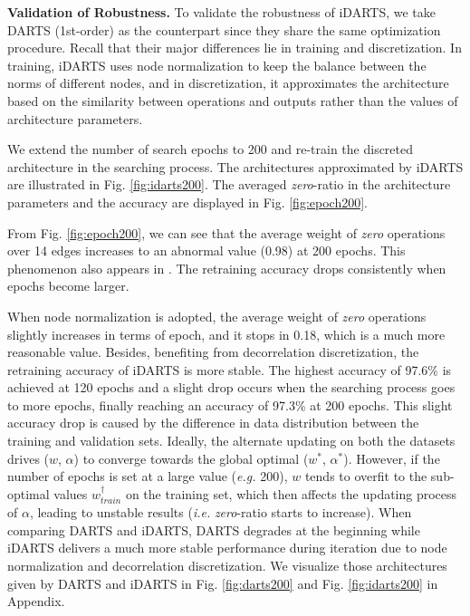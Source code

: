 \documentclass[journal]{IEEEtran}
\begin{document}
\textbf{Validation of Robustness.} To validate the robustness of iDARTS, we take DARTS (1st-order) as the counterpart since they share the same optimization procedure. Recall that their major differences lie in training and discretization. In training, iDARTS uses node normalization to keep the balance between the norms of different nodes, and in discretization, it approximates the architecture based on the similarity between operations and outputs rather than the values of architecture parameters. 


We extend the number of search epochs to 200 and re-train the discreted architecture in the searching process. The architectures approximated by iDARTS are illustrated in Fig. \ref{fig:idarts200}. The averaged \textit{zero}-ratio in the architecture parameters and the accuracy are displayed in Fig. \ref{fig:epoch200}.


From Fig. \ref{fig:epoch200}, we can see that the average weight of \textit{zero} operations over 14 edges increases to an abnormal value (0.98) at 200 epochs. This phenomenon also appears in \cite{DBLP:journals/corr/abs-1910-11831}. The retraining accuracy drops consistently when epochs become larger.

When node normalization is adopted, the average weight of \textit{zero} operations slightly increases in terms of epoch, and it stops in 0.18, which is a much more reasonable value. Besides, benefiting from decorrelation discretization, the retraining accuracy of iDARTS is more stable. The highest accuracy of 97.6\% is achieved at 120 epochs and a slight drop occurs when the searching process goes to more epochs, finally reaching an accuracy of 97.3\% at 200 epochs. This slight accuracy drop is caused by the difference in data distribution between the training and validation sets.  Ideally, the alternate updating on both the datasets drives ($w$, $\alpha$) to converge towards the global optimal ($w^*$, $\alpha^*$). However, if the number of epochs is set at a large value (\emph{e.g.} 200), $w$ tends to overfit to the sub-optimal values $w_{train}^\dag$ on the training set, which then affects the updating process of $\alpha$, leading to unstable results (\emph{i.e.} \textit{zero}-ratio starts to increase). When comparing DARTS and iDARTS, DARTS degrades at the beginning while iDARTS delivers a much more stable performance during iteration due to node normalization and decorrelation discretization. We visualize those architectures given by DARTS and iDARTS in Fig. \ref{fig:darts200} and Fig. \ref{fig:idarts200} in Appendix.
\end{document}
